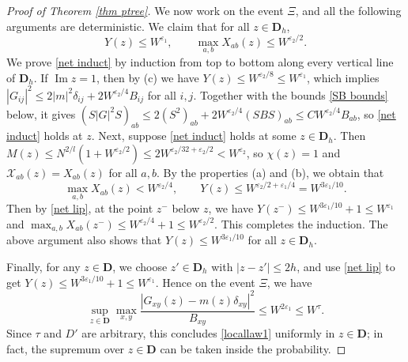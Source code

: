 \documentclass{article}
\newcommand{\1}{\mathds{1}}
\numberwithin{equation}{section}
\newcommand{\be}{\begin{equation}}
\newcommand{\ee}{\end{equation}}
\newcommand{\e}{{\varepsilon}}
\renewcommand{\cal}{\mathcal}
\newcommand{\ii}{\mathrm{i}} %
\renewcommand{\leq}{\leqslant}
\renewcommand{\le}{\leq}
\newcommand{\R}{\mathbb{R}}
\DeclareMathOperator{\im}{Im}
\theoremstyle{plain} %
\theoremstyle{remark}
\begin{document}
\begin{proof}[Proof of Theorem \ref{thm ptree}]
\medskip
{} We now work on the event $\Xi$, and all the following arguments are deterministic. We claim that for all $z\in \mathbf D_h$,
\be\label{net induct}
Y(z)\le W^{\e_1},\qquad \max_{a,b}X_{ab}(z)\le W^{\e_2/2}.
\ee
We prove \eqref{net induct} by induction from top to bottom along every vertical line of $\mathbf D_h$. If $\im z=1$, then by (c) we have $Y(z)\le W^{\e_2/8}\le W^{\e_1}$, which implies $|G_{ij}|^2\le 2|m|^2\delta_{ij}+2W^{\e_2/4}B_{ij}$ for all $i,j$. Together with the bounds \eqref{SB bounds} below, it gives $(S|G|^2S)_{ab}\le 2(S^2)_{ab}+2W^{\e_2/4}(SBS)_{ab}\le CW^{\e_2/4}B_{ab}$, so \eqref{net induct} holds at $z$. Next, suppose \eqref{net induct} holds at some $z\in \mathbf D_h$. Then $M(z)\le N^{2/l}(1+W^{\e_2/2})\le 2W^{\e_2/32+\e_2/2}< W^{\e_2}$, so $\chi(z)=1$ and $\cal X_{ab}(z)=X_{ab}(z)$ for all $a,b$. By the properties (a) and (b), we obtain that
$$\max_{a,b}X_{ab}(z)< W^{\e_2/4},\qquad Y(z)\le W^{\e_2/2+\e_1/4}=W^{3\e_1/10}.$$
Then by \eqref{net lip}, at the point $z^-$ below $z$, we have $Y(z^-)\le W^{3\e_1/10}+1\le W^{\e_1}$ and $\max_{a,b}X_{ab}(z^-)\le W^{\e_2/4}+1\le W^{\e_2/2}$. This completes the induction. The above argument also shows that $Y(z)\le W^{3\e_1/10}$ for all $z\in \mathbf D_h$.

Finally, for any $z\in \mathbf D$, we choose $z'\in \mathbf D_h$ with $|z-z'|\le 2h$, and use \eqref{net lip} to get $Y(z)\le W^{3\e_1/10}+1\le W^{\e_1}$. Hence on the event $\Xi$, we have
$$\sup_{z\in \mathbf D}\max_{x,y}\frac{|G_{xy}(z)-m(z)\delta_{xy}|^2}{B_{xy}}\le W^{2\e_1}\le W^{\tau}.$$
Since $\tau$ and $D'$ are arbitrary, this concludes \eqref{locallaw1} uniformly in $z\in \mathbf D$; in fact, the supremum over $z\in \mathbf D$ can be taken inside the probability.
% 	
 \end{proof}
\end{document}
